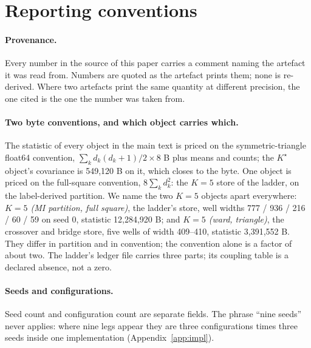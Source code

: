 \documentclass{article} %
\newcommand{\Kstar}{\ensuremath{K^{\star}}}
\begin{document}
\section{Reporting conventions}
\label{app:conventions}

\paragraph{Provenance.} Every number in the source of this paper carries a comment naming the
artefact it was read from. Numbers are quoted as the artefact prints them; none is re-derived.
Where two artefacts print the same quantity at different precision, the one cited is the one the
number was taken from.

\paragraph{Two byte conventions, and which object carries which.} The statistic of every object
in the main text is priced on the symmetric-triangle float64 convention,
$\sum_k d_k(d_k+1)/2\times8$ B plus means and counts; the $\Kstar$ object's covariance is
549,120 B on it, which closes to the byte. %
One object is priced on the full-square convention, $8\sum_k d_k^2$: the $K=5$ store of the
ladder, on the label-derived partition. We name the two $K=5$ objects apart everywhere:
\emph{$K=5$ (MI partition, full square)}, the ladder's store, well widths 777 / 936 / 216 / 60 /
59 on seed 0, statistic 12,284,920 B; and \emph{$K=5$ (ward, triangle)}, the crossover and
bridge store, five wells of width 409--410, statistic 3,391,552 B. They differ in partition and
in convention; the convention alone is a factor of about two.
The ladder's ledger file carries three parts; its coupling table is a declared absence, not a
zero. %

\paragraph{Seeds and configurations.} Seed count and configuration count are separate fields. The
phrase ``nine seeds'' never applies: where nine legs appear they are three configurations times
three seeds inside one implementation (Appendix~\ref{app:impl}).

\end{document}
